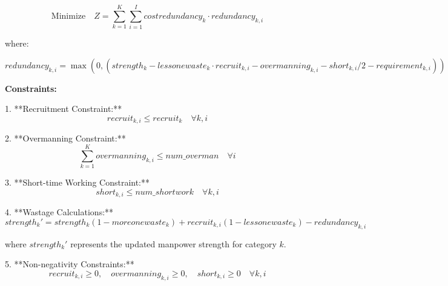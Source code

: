 \documentclass{article}
\begin{document}
\[
\text{Minimize} \quad Z = \sum_{k=1}^{K} \sum_{i=1}^{I} costredundancy_k \cdot redundancy_{k,i}
\]

where:

\[
redundancy_{k,i} = \max(0, (strength_k - lessonewaste_k \cdot recruit_{k,i} - overmanning_{k,i} - short_{k,i}/2 - requirement_{k,i}))
\]

\textbf{Constraints:}

1. **Recruitment Constraint:**
\[
recruit_{k,i} \leq recruit_k \quad \forall k, i
\]

2. **Overmanning Constraint:**
\[
\sum_{k=1}^{K} overmanning_{k,i} \leq num\_overman \quad \forall i
\]

3. **Short-time Working Constraint:**
\[
short_{k,i} \leq num\_shortwork \quad \forall k, i
\]

4. **Wastage Calculations:**
\[
strength_k' = strength_k(1 - moreonewaste_k) + recruit_{k,i} (1 - lessonewaste_k) - redundancy_{k,i}
\]

where \(strength_k'\) represents the updated manpower strength for category \(k\).

5. **Non-negativity Constraints:**
\[
recruit_{k,i} \geq 0, \quad overmanning_{k,i} \geq 0, \quad short_{k,i} \geq 0 \quad \forall k, i
\]
\end{document}
